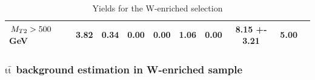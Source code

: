 \begin{table}[!htb]
\begin{center}
\begin{tabular}{lccccccccc}
 $\,{M_{T2}} > 500$ GeV & 3.82  & 0.34  & 0.00  & 0.00  & 1.06   & 0.00  & 8.15 +- 3.21 & 5.00  \\
\hline\hline 
\end{tabular} 
\caption{Yields for the W-enriched selection}
\label{tab:WenrichYields}
\end{center} 
\end{table}

\subsubsection{\texorpdfstring{$\rm{t\bar{t}}$ background estimation in W-enriched sample}{tt background estimation in W-enriched sample}}

